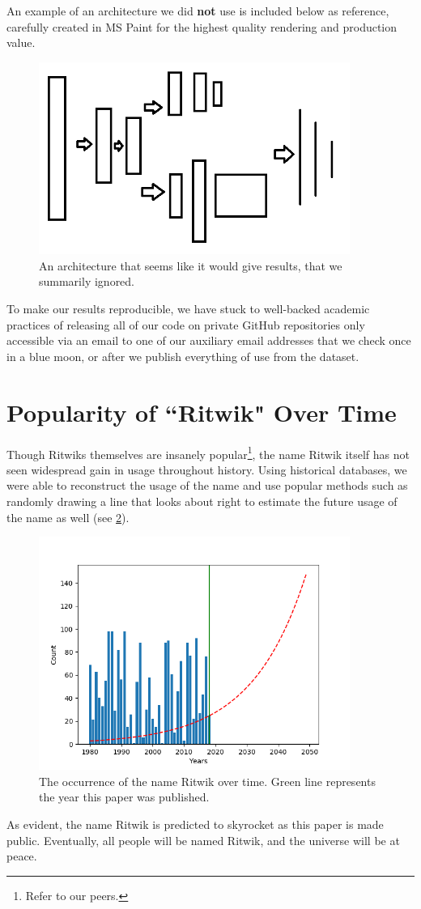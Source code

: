 \documentclass[]{article}
\begin{document}
An example of an architecture we did \textbf{not} use is included below as reference, carefully created in MS Paint for the highest quality rendering and production value.

\begin{figure}[h]
	\centering
	\includegraphics[width=4in]{figures/Neuralnet}
	\caption{An architecture that seems like it would give results, that we summarily ignored.}
	\label{fig:neuralnet}
\end{figure}

To make our results reproducible, we have stuck to well-backed academic practices of releasing all of our code on private GitHub repositories only accessible via an email to one of our auxiliary email addresses that we check once in a blue moon, or after we publish everything of use from the dataset.

\section{Popularity of ``Ritwik" Over Time}
Though Ritwiks themselves are insanely popular\footnote{Refer to our peers.}, the name Ritwik itself has not seen widespread gain in usage throughout history. Using historical databases, we were able to reconstruct the usage of the name and use popular methods such as randomly drawing a line that looks about right to estimate the future usage of the name as well (see \ref{fig:usageofritwik}).
\begin{figure}[h]
	\centering
	\includegraphics[width=4in]{figures/UsageOfRitwik}
	\caption{The occurrence of the name Ritwik over time. Green line represents the year this paper was published.}
	\label{fig:usageofritwik}
\end{figure}
As evident, the name Ritwik is predicted to skyrocket as this paper is made public. Eventually, all people will be named Ritwik, and the universe will be at peace.
\end{document}
